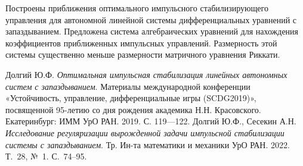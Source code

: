 Построены  приближения   оптимального импульсного стабилизирующего управления для  автономной линейной системы дифференциальных уравнений с запаздыванием.  Предложена система алгебраических уравнений для нахождения коэффициентов  приближенных импульсных управлений. Размерность этой системы существенно меньше размерности матричного уравнения Риккати.






\begin{thebibliography}{99}
Долгий Ю.Ф. {\it Оптимальная импульсная стабилизация линейных автономных систем с запаздыванием}. Материалы международной конференции «Устойчивость, управление, дифференциальные игры (SCDG2019)», посвященной 95-летию со дня рождения академика Н.Н. Красовского. Екатеринбург: ИММ УрО РАН. 2019. С.  119—122.
Долгий Ю.Ф., Сесекин А.Н.  {\it Исследование регуляризации вырожденной задачи импульсной стабилизации системы с запаздыванием}. Тр. Ин-та математики и механики УрО РАН. 2022. Т.~28, №~1. С.~74--95.
\end{thebibliography}






%

